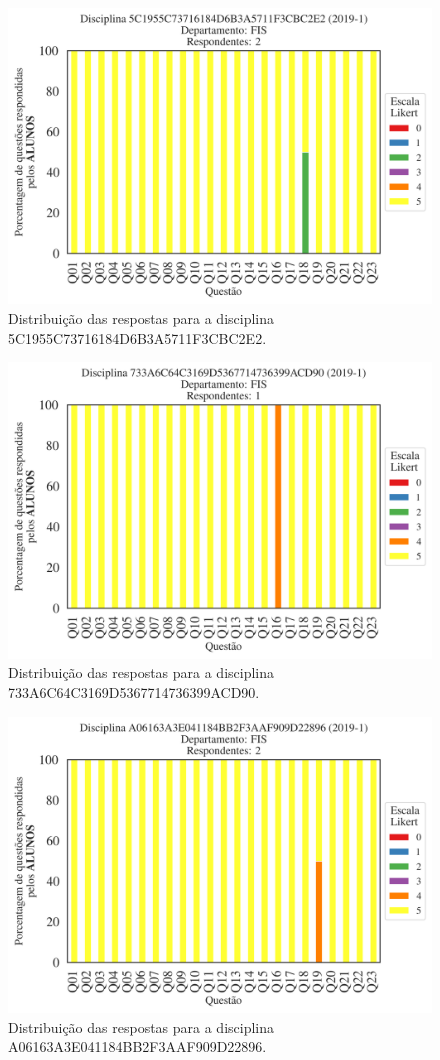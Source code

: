 \documentclass[a4paper,10pt]{article}
\begin{document}
\begin{figure}[h]
\centering
\includegraphics[width=0.485\linewidth]{analise_disciplina_departamento_FIS_ALUNO_TURMA_5C1955C73716184D6B3A5711F3CBC2E2.png}
\caption{\label{fig:analise_geral_departamento}                Distribuição das respostas para a disciplina 5C1955C73716184D6B3A5711F3CBC2E2.}
\end{figure}
\begin{figure}[h]
\centering
\includegraphics[width=0.485\linewidth]{analise_disciplina_departamento_FIS_ALUNO_TURMA_733A6C64C3169D5367714736399ACD90.png}
\caption{\label{fig:analise_geral_departamento}                Distribuição das respostas para a disciplina 733A6C64C3169D5367714736399ACD90.}
\end{figure}
\begin{figure}[h]
\centering
\includegraphics[width=0.485\linewidth]{analise_disciplina_departamento_FIS_ALUNO_TURMA_A06163A3E041184BB2F3AAF909D22896.png}
\caption{\label{fig:analise_geral_departamento}                Distribuição das respostas para a disciplina A06163A3E041184BB2F3AAF909D22896.}
\end{figure}
\end{document}
